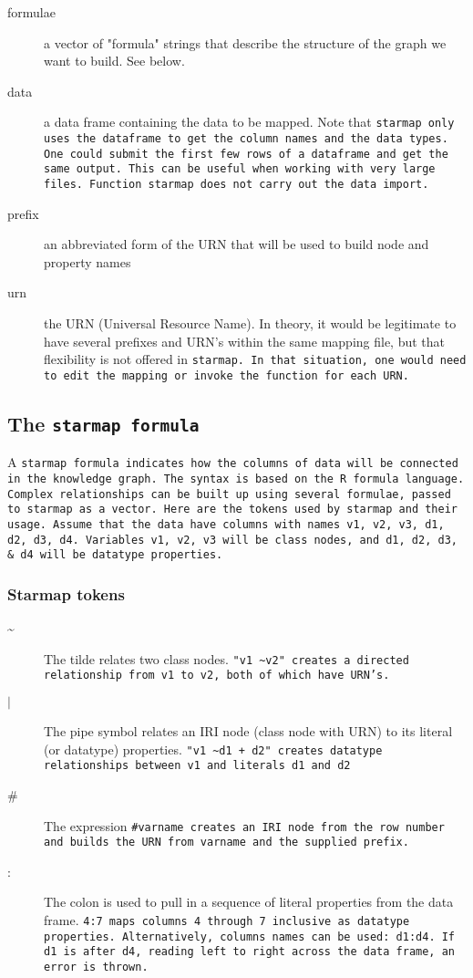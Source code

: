 \documentclass{article}\usepackage[]{graphicx}\usepackage[]{xcolor}
\begin{document}
\begin{description}
\item[formulae] a vector of "formula" strings that describe the structure of the graph we want to build. See below.
\item[data] a data frame containing the data to be mapped. Note that \tt{starmap} only uses the dataframe to get the column names and the data types. One could submit the first few rows of a dataframe and get the same output. This can be useful when working with very large files. Function \tt{starmap} does not carry out the data import.
\item[prefix] an abbreviated form of the URN that will be used to build node and property names
\item[urn] the URN (Universal Resource Name). In theory, it would be legitimate to have several prefixes and URN's within the same mapping file, but that flexibility is not offered in \tt{starmap}. In that situation, one would need to edit the mapping or invoke the function for each URN.
\end{description}

\subsection{The \tt{starmap} formula}

A \tt{starmap} formula indicates how the columns of data will be connected in the knowledge graph. The syntax is based on the R formula language. Complex relationships can be built up using several formulae, passed to \tt{starmap} as a vector. Here are the tokens used by \tt{starmap} and their usage. Assume that the data have columns with names v1, v2, v3, d1, d2, d3, d4. Variables v1, v2, v3 will be class nodes, and d1, d2, d3, \& d4 will be datatype properties.

\subsubsection{Starmap tokens}

\begin{description}
\item[\textasciitilde] The tilde relates two class nodes. \tt{"v1 \textasciitilde  v2"} creates a directed relationship from v1 to v2, both of which have URN's.
\item[$\vert$] The pipe symbol relates an IRI node (class node with URN) to its literal (or datatype) properties. \tt{"v1  \textasciitilde d1 + d2"} creates datatype relationships between \tt{v1} and literals \tt{d1} and \tt{d2}
\item[\#] The expression \tt{\#varname} creates an IRI node from the row number and builds the URN from \tt{varname} and the supplied prefix.
\item[:] The colon is used to pull in a sequence of literal properties from the data frame. \tt{4:7} maps columns 4 through 7 inclusive as datatype properties. Alternatively, columns names can be used: \tt{d1:d4}. If d1 is after d4, reading left to right across the data frame, an error is thrown.
\end{description}
\end{document}
